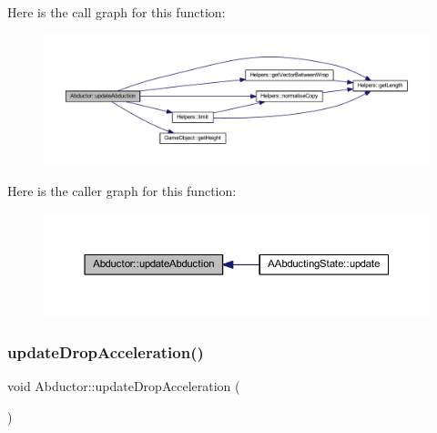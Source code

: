 Here is the call graph for this function\+:
\nopagebreak
\begin{figure}[H]
\begin{center}
\leavevmode
\includegraphics[width=350pt]{class_abductor_aa9e1628fe605674f599b1ff535c31ac1_cgraph}
\end{center}
\end{figure}
Here is the caller graph for this function\+:
\nopagebreak
\begin{figure}[H]
\begin{center}
\leavevmode
\includegraphics[width=350pt]{class_abductor_aa9e1628fe605674f599b1ff535c31ac1_icgraph}
\end{center}
\end{figure}
\mbox{\label{class_abductor_aab823ab3fd94214f90b003661e036d03}} 
\subsubsection{\texorpdfstring{update\+Drop\+Acceleration()}{updateDropAcceleration()}}
{\footnotesize\ttfamily void Abductor\+::update\+Drop\+Acceleration (\begin{DoxyParamCaption}{ }\end{DoxyParamCaption})}

